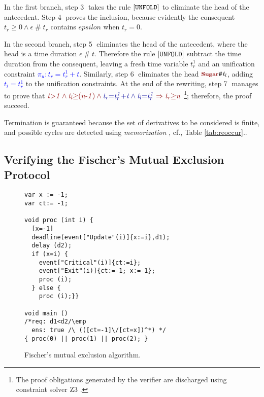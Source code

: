 \documentclass[acmsmall,10pt,review]{acmart}
\newcommand{\anyevent}[1]{{\textcolor{darkred}
{{\textbf{\footnotesize #1}}}}}
\newcommand{\code}[1]{{\tt{\ensuremath{\m{#1}}}}}
\newcommand{\codeme}[1]{{\tt{\ensuremath{#1}}}}
\newcommand{\m}{\mathit}
\newcommand{\mysharp}{{\mathrel{\texttt{\#}}}}
\newcommand\tabref[1]{Table \textcolor{black}{\ref{#1}}.}
\begin{document}
{In the first branch, step \textcircled{3} takes the rule 
$\codeme{[UNFOLD]}$ to eliminate the head of the antecedent. 
Step \textcircled{4} proves the inclusion, because 
evidently the consequent \code{t_r {\geq} 0 \wedge \epsilon \mysharp t_r} 
contains \code{epsilon} when \code{t_r{=}0}. 

In the second branch, step \textcircled{5} eliminates the 
head of the antecedent, where the head is a time duration \code{\epsilon\mysharp t}. 
Therefore the rule $\codeme{[UNFOLD]}$ subtract the time duration 
from the consequent, leaving a fresh time variable \code{t_r^1} and 
an unification constraint \textcolor{blue}{\code{\pi_u : t_r{=}t_r^1 {+}t}}. 
Similarly, step \textcircled{6} eliminates the head 
\code{\anyevent{Sugar}\mysharp t_l}, adding \textcolor{blue}{\code{t_l{=}t_r^1}} 
to the unification constraints. 
At the end of the rewriting, step \textcircled{7} manages to prove that 
\code{\textcolor {darkred}{  t{>}1 \wedge t_l{\geq}(n\text{-}1) 
\wedge  \textcolor{blue}{t_r{=}t_r^1 {+}t \wedge  t_l{=}t_r^1}  \Rightarrow t_r{\geq}n
}  } \footnote{The proof obligations generated by the verifier are discharged using constraint solver Z3 \cite{DBLP:conf/tacas/MouraB08}.}; therefore, the proof succeed.

Termination is guaranteed because the set of derivatives to be considered is finite, and possible cycles are detected using 
\emph{memorization} \cite{DBLP:conf/tableaux/Brotherston05}, cf., \tabref{tab:reoccur}. 
\\

\subsection{Verifying the Fischer’s Mutual Exclusion Protocol}




\begin{wrapfigure}{L}{0.51\columnwidth}
  \vspace{-5mm}
\begin{lstlisting}
var x := -1; 
var ct:= -1;

void proc (int i) {
  [x=-1] 
  deadline(event["Update"(i)]{x:=i},d1);
  delay (d2);
  if (x=i) {
    event["Critical"(i)]{ct:=i};
    event["Exit"(i)]{ct:=-1; x:=-1};
    proc (i);
  } else {
    proc (i);}}

void main () 
/*req: d1<d2/\emp
  ens: true /\ (([ct=-1]\/[ct=x])^*) */ 
{ proc(0) || proc(1) || proc(2); }
\end{lstlisting}  
  \caption{Fischer's mutual exclusion algorithm.}\label{fig:overview_ficher}
\end{wrapfigure}

}
\end{document}
